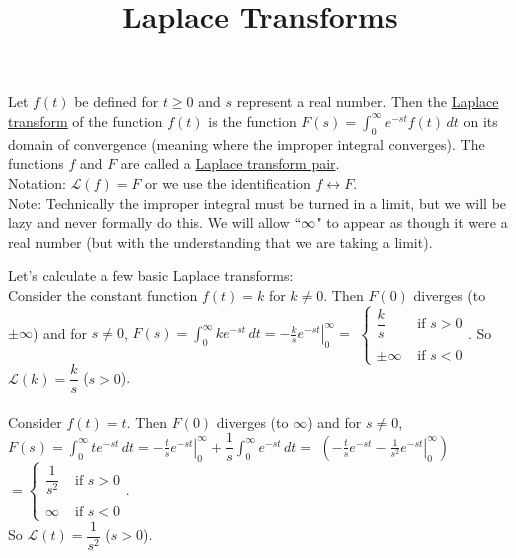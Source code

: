\documentclass{ximera}
\begin{document}
\begin{abstract}
 \end{abstract}

    \title{Laplace Transforms}
    
    \maketitle

 Let $f(t)$ be defined for $t\geq 0$ and $s$ represent a real number.   Then the \underline{Laplace transform} of the function $f(t)$ is the function  $\displaystyle F(s)=\int_{0}^{\infty}e^{-st}f(t)\,dt$ on its domain of convergence (meaning where the improper integral converges).  The functions $f$ and $F$ are called a \underline{Laplace transform pair}.\\

 Notation:  $\mathcal{L}(f)=F$ or we use the identification $f\leftrightarrow F$.\\

 Note:  Technically the improper integral must be turned in a limit, but we will be lazy and never formally do this.  We will allow $``\infty$" to appear as though it were a real number (but with the understanding that we are taking a limit).

\vspace{1cm}

 Let's calculate a few basic Laplace transforms:\\

 Consider the constant function $f(t)=k$ for $k\neq 0$.  Then $F(0)$ diverges (to $\pm \infty$) and for $s\neq 0$, $\displaystyle F(s)=\int_{0}^{\infty}ke^{-st}\,dt=\left.-\frac{k}{s}e^{-st}\right|_{0}^{\infty}=$  $\displaystyle \left\{
     \begin{array}{lr}
       \dfrac{k}{s} & \mbox{ if }s>0\\
       \\
       \pm \infty &  \mbox{ if }s<0
     \end{array}\right.$.  So $\mathcal{L}(k)=\dfrac{k}{s}$ ($s>0$).\\ \\


 Consider $f(t)=t$.  Then $F(0)$ diverges (to $\infty$) and for $s\neq 0$, \\$\displaystyle F(s)=\int_{0}^{\infty}te^{-st}\,dt=\left.-\frac{t}{s}e^{-st}\right|_{0}^{\infty}+\dfrac{1}{s}\int_{0}^{\infty}e^{-st}\,dt=$  $\displaystyle \left(\left.-\frac{t}{s}e^{-st}-\frac{1}{s^2}e^{-st}\right|_{0}^{\infty}\right)$  $\displaystyle =\left\{
     \begin{array}{lr}
       \dfrac{1}{s^{2}} & \mbox{ if }s>0\\
      \\
       \infty &  \mbox{ if }s<0
     \end{array}\right.$.  \\ So $\mathcal{L}(t)=\dfrac{1}{s^2}$  ($s>0$). \\ \\
\end{document}
